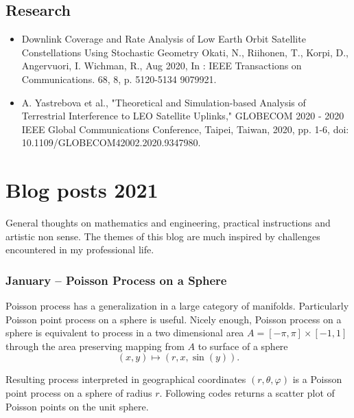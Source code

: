 \documentclass{article}
\begin{document}
\subsection{Research}

\begin{itemize}
\item Downlink Coverage and Rate Analysis of Low Earth Orbit Satellite Constellations Using Stochastic Geometry
  Okati, N., Riihonen, T., Korpi, D., Angervuori, I. Wichman, R., Aug 2020, In : IEEE Transactions on Communications. 68, 8, p. 5120-5134 9079921.\\
\item A. Yastrebova et al., "Theoretical and Simulation-based Analysis of Terrestrial Interference to LEO Satellite Uplinks," GLOBECOM 2020 - 2020 IEEE Global Communications Conference, Taipei, Taiwan, 2020, pp. 1-6, doi: 10.1109/GLOBECOM42002.2020.9347980.
\end{itemize}


\section{Blog posts 2021}
General thoughts on mathematics and engineering, practical instructions and artistic non sense. The themes of this blog are much inspired by challenges encountered in my professional life.

\subsubsection{January – Poisson Process on a Sphere}
Poisson process has a generalization in a large category of manifolds. Particularly Poisson point process on a sphere is useful. Nicely enough, Poisson process on a sphere is equivalent to process in a two dimensional area $ A = [-\pi,\pi] \times [-1,1]$ through the area preserving mapping from $A$ to surface of a sphere
\begin{equation}
  (x,y) \mapsto (r,x,\sin(y)) \nonumber.
\end{equation}


Resulting process interpreted in geographical coordinates $(r,\theta,\varphi)$ is a Poisson point process on a sphere of radius $r$.  Following codes returns a scatter plot of Poisson points on the unit sphere.
\end{document}
